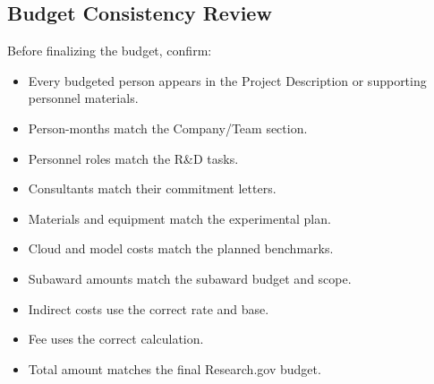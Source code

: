 \documentclass[11pt,letterpaper]{article}
\begin{document}
\subsection*{Budget Consistency Review}

Before finalizing the budget, confirm:

\begin{itemize}
    \item[$\square$] Every budgeted person appears in the Project Description
    or supporting personnel materials.
    \item[$\square$] Person-months match the Company/Team section.
    \item[$\square$] Personnel roles match the R\&D tasks.
    \item[$\square$] Consultants match their commitment letters.
    \item[$\square$] Materials and equipment match the experimental plan.
    \item[$\square$] Cloud and model costs match the planned benchmarks.
    \item[$\square$] Subaward amounts match the subaward budget and scope.
    \item[$\square$] Indirect costs use the correct rate and base.
    \item[$\square$] Fee uses the correct calculation.
    \item[$\square$] Total amount matches the final Research.gov budget.
\end{itemize}
\end{document}
